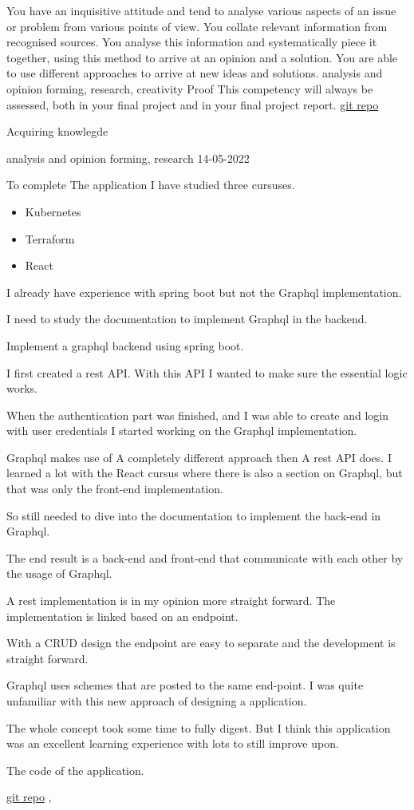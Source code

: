 \competentie
{%
	\competentieformulier
	{%
		You have an inquisitive attitude and tend to analyse various aspects of an issue or problem from various points of view. You collate relevant information from recognised sources. You analyse this information and systematically piece it together, using this method to arrive at an opinion and a solution. You are able to use different approaches to arrive at new ideas and solutions.
	}
	{%
		analysis and opinion forming,%
		research,%
		creativity%
	}
	{%
		Proof
	}
	{%
		This competency will always be assessed, both in your final project and in your final project report.
	}
	{%
		\href{https://github.com/aladante/product_inventaris}{git repo}
	}
}
{%
	\bewijs
	{%
		Acquiring knowlegde
	}
	{%
		\starr
		{%
			analysis and opinion forming,
			research
		}
		{%
			14-05-2022
		}
		{%
			To complete The application I have studied three cursuses.
			\begin{itemize}
				\item Kubernetes
				\item Terraform
				\item React
			\end{itemize}

			I already have experience with spring boot but not the Graphql implementation.

			I need to study the documentation to implement Graphql in the backend.
		}
		{%
			Implement a graphql backend using spring boot.
		}
		{%
			I first created a rest API. With this API I wanted to make sure the essential logic works.

			When the authentication part was finished, and I was able to create and login with user credentials I started working on the Graphql implementation.

			Graphql makes use of A completely different approach then A rest API does.
			I learned a lot with the React cursus where there is also a section on Graphql, but that was only the front-end implementation.

			So still needed to dive into the documentation to implement the back-end in Graphql.

		}
		{%
			The end result is a back-end and front-end that communicate with each other by the usage of Graphql.
		}
		{%
			A rest implementation is in my opinion more straight forward.
			The implementation is linked based on an endpoint.

			With a CRUD design the endpoint are easy to separate and the development is straight forward.

			Graphql uses schemes that are posted to the same end-point.
			I was quite unfamiliar with this new approach of designing a application.

			The whole concept took some time to fully digest.
			But I think this application was an excellent learning experience with lots to still improve upon.

		}
		{
			The code of the application.
		}
	}
	{%
		\href{https://github.com/aladante/product_inventaris}{git repo}
	},
}
